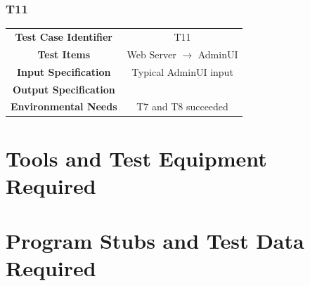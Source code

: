 \documentclass{article}
\begin{document}
\subsubsection{T11}
\begin{adjustbox}{width=1.2\textwidth}	
	\begin{tabular}{*{2}{c}}
		\midrule
		\textbf{Test Case Identifier} & T11\\
		\textbf{Test Items} & Web Server $\rightarrow$ AdminUI\\
		\textbf{Input Specification} & Typical AdminUI input\\
		\textbf{Output Specification} & \\ %
		\textbf{Environmental Needs} & T7 and T8 succeeded\\
		\bottomrule
	\end{tabular}
\end{adjustbox}
\section{Tools and Test Equipment Required}
\section{Program Stubs and Test Data Required}
\end{document}
